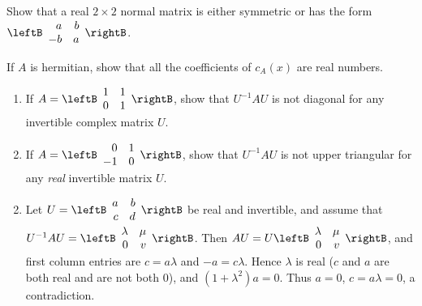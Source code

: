 \begin{multicols}{2}
\begin{ex}
\begin{sol}
\begin{enumerate}[label={\alph*.}]
\end{enumerate}
\end{sol}
\end{ex}

\begin{ex}
Show that a real $2 \times 2$ normal matrix is either symmetric or has the form $\leftB \begin{array}{rr}
a & b \\
-b & a
\end{array}\rightB$.
\end{ex}

\begin{ex}
If $A$ is hermitian, show that all the coefficients of $c_{A}(x)$ are real numbers.
\end{ex}

\begin{ex}
\begin{enumerate}[label={\alph*.}]
\item If $A = \leftB \begin{array}{rr}
1 & 1 \\
0 & 1
\end{array}\rightB$, show that $U^{-1}AU$ is not diagonal for any invertible complex matrix $U$.

\item If $A = \leftB \begin{array}{rr}
0 & 1 \\
-1 & 0
\end{array}\rightB$, show that $U^{-1}AU$ is not upper triangular for any \textit{real} invertible matrix $U$.

\end{enumerate}
\begin{sol}
\begin{enumerate}[label={\alph*.}]
\setcounter{enumi}{1}
\item  Let $U = \leftB \begin{array}{rr}
a & b \\
c & d
\end{array}\rightB$ be real and invertible, and assume that $U^{-1}AU = \leftB \begin{array}{rr}
\lambda & \mu \\
0 & v
\end{array}\rightB$.
 Then $AU = U\leftB \begin{array}{rr}
 \lambda & \mu \\
 0 & v
 \end{array}\rightB$, and first column entries are $c = a\lambda$ and $-a = c\lambda$. Hence $\lambda$ is real ($c$ and $a$ are both real and are not both $0$), and $(1 + \lambda^{2})a = 0$. Thus $a = 0$, $c = a\lambda = 0$, a contradiction.


\end{enumerate}
\end{sol}
\end{ex}
\end{multicols}

